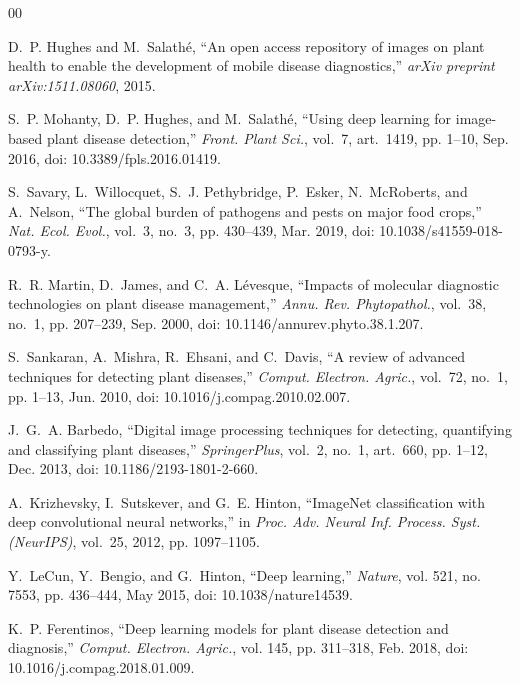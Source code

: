 \documentclass[journal]{IEEEtran}
\begin{document}
\begin{thebibliography}{00}

D.~P. Hughes and M.~Salath{\'e}, ``An open access repository of images on plant health to enable the development of mobile disease diagnostics,'' \textit{arXiv preprint arXiv:1511.08060}, 2015.

S.~P. Mohanty, D.~P. Hughes, and M.~Salath{\'e}, ``Using deep learning for image-based plant disease detection,'' \textit{Front. Plant Sci.}, vol.~7, art.~1419, pp. 1--10, Sep. 2016, doi: 10.3389/fpls.2016.01419.

S.~Savary, L.~Willocquet, S.~J. Pethybridge, P.~Esker, N.~McRoberts, and A.~Nelson, ``The global burden of pathogens and pests on major food crops,'' \textit{Nat. Ecol. Evol.}, vol.~3, no.~3, pp. 430--439, Mar. 2019, doi: 10.1038/s41559-018-0793-y.

R.~R. Martin, D.~James, and C.~A. L{\'e}vesque, ``Impacts of molecular diagnostic technologies on plant disease management,'' \textit{Annu. Rev. Phytopathol.}, vol.~38, no.~1, pp. 207--239, Sep. 2000, doi: 10.1146/annurev.phyto.38.1.207.

S.~Sankaran, A.~Mishra, R.~Ehsani, and C.~Davis, ``A review of advanced techniques for detecting plant diseases,'' \textit{Comput. Electron. Agric.}, vol.~72, no.~1, pp. 1--13, Jun. 2010, doi: 10.1016/j.compag.2010.02.007.

J.~G.~A. Barbedo, ``Digital image processing techniques for detecting, quantifying and classifying plant diseases,'' \textit{SpringerPlus}, vol.~2, no.~1, art.~660, pp. 1--12, Dec. 2013, doi: 10.1186/2193-1801-2-660.

A.~Krizhevsky, I.~Sutskever, and G.~E. Hinton, ``ImageNet classification with deep convolutional neural networks,'' in \textit{Proc. Adv. Neural Inf. Process. Syst. (NeurIPS)}, vol.~25, 2012, pp. 1097--1105.

Y.~LeCun, Y.~Bengio, and G.~Hinton, ``Deep learning,'' \textit{Nature}, vol. 521, no. 7553, pp. 436--444, May 2015, doi: 10.1038/nature14539.

K.~P. Ferentinos, ``Deep learning models for plant disease detection and diagnosis,'' \textit{Comput. Electron. Agric.}, vol. 145, pp. 311--318, Feb. 2018, doi: 10.1016/j.compag.2018.01.009.


\end{thebibliography}
\end{document}
